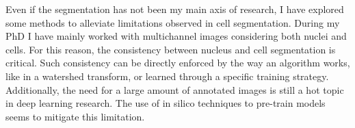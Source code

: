 Even if the segmentation has not been my main axis of research, I have explored some methods to alleviate limitations observed in cell segmentation.
During my PhD I have mainly worked with multichannel images considering both nuclei and cells.
For this reason, the consistency between nucleus and cell segmentation is critical.
Such consistency can be directly enforced by the way an algorithm works, like in a watershed transform, or learned through a specific training strategy.
Additionally, the need for a large amount of annotated images is still a hot topic in deep learning research.
The use of in silico techniques to pre-train models seems to mitigate this limitation.
